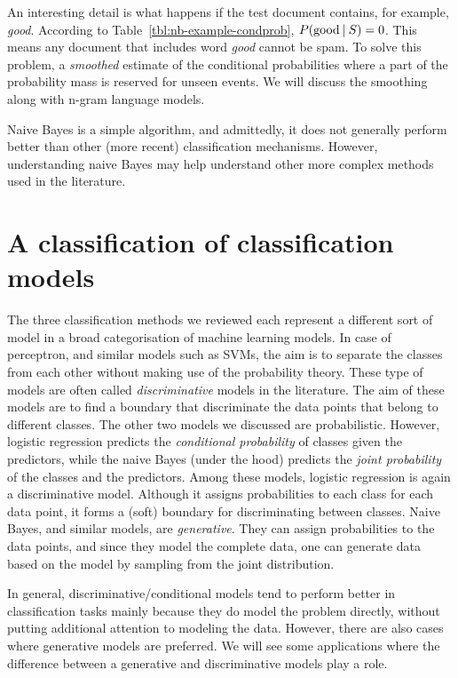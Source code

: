 An interesting detail is what happens if the test document contains,
for example, \emph{good}.
According to Table~\ref{tbl:nb-example-condprob}, $P(\text{good}\:\vert\:{}S) = 0$.
This means any document that includes word \emph{good} cannot be spam.
To solve this problem, a \emph{smoothed} estimate of the conditional probabilities 
where a part of the probability mass is reserved for unseen events.
We will discuss the smoothing along with n-gram language models.

Naive Bayes is a simple algorithm,
and admittedly, it does not generally perform better than other
(more recent) classification mechanisms.
However, understanding naive Bayes may help understand  
other more complex methods used in the literature.

\section{A classification of classification models}

The three classification methods we reviewed each represent
a different sort of model in a broad categorisation of machine learning models.
In case of perceptron, and similar models such as SVMs,
the aim is to separate the classes from each other
without making use of the probability theory.%
These type of models are often called \emph{discriminative} models in the literature.
The aim of these models are to find a boundary
that discriminate the data points that belong to different classes.
The other two models we discussed are probabilistic.
However, logistic regression predicts
the \emph{conditional probability} of classes given the predictors,
while the naive Bayes
(under the hood) predicts the \emph{joint probability} of
the classes and the predictors.
Among these models, logistic regression is again
a discriminative model.
Although it assigns probabilities to each class
for each data point,
it forms a (soft) boundary for discriminating between classes.
Naive Bayes, and similar models, are \emph{generative}. 
They can assign probabilities to the data points,
and since they model the complete data,
one can generate data based on the model by
sampling from the joint distribution.

In general, discriminative/conditional models tend to perform better
in classification tasks mainly because they do model the problem directly,
without putting additional attention to modeling the data.
However, there are also cases where generative models are preferred.
We will see some applications where the  difference between a generative
and discriminative models play a role.


